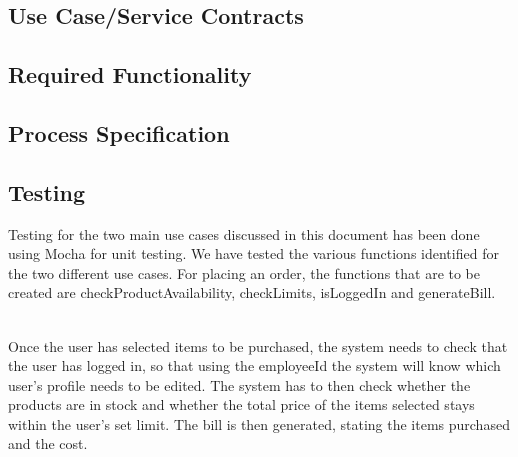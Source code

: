 \documentclass[12pt]{article}
\begin{document}
\subsection{Use Case/Service Contracts}

\subsection{Required Functionality}

\subsection{Process Specification}

\subsection{Testing}

Testing for the two main use cases discussed in this document has been done using Mocha for unit testing. We have tested the various functions identified for the two different use cases. For placing an order, the functions that are to be created are checkProductAvailability, checkLimits, isLoggedIn and generateBill. 

\\Once the user has selected items to be purchased, the system needs to check that the user has logged in, so that using the employeeId the system will know which user's profile needs to be edited. The system has to then check whether the products are in stock and whether the total price of the items selected stays within the user's set limit. The bill is then generated, stating the items purchased and the cost.
\end{document}
